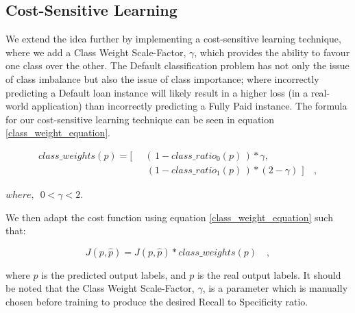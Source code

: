             \subsection{Cost-Sensitive Learning} \label{cost_sensitive_learning}
            
                We extend the idea further by implementing a cost-sensitive learning technique, where we add a Class Weight Scale-Factor, $\gamma$, which provides the ability to favour one class over the other. The Default classification problem has not only the issue of class imbalance but also the issue of class importance; where incorrectly predicting a Default loan instance will likely result in a higher loss (in a real-world application) than incorrectly predicting a Fully Paid instance. The formula for our cost-sensitive learning technique can be seen in equation \ref{class_weight_equation}.
                
                \begin{align} \label{class_weight_equation}
                    class\_weights(p) = [\,
                    & \, 
                        \, (\,1 - class\_ratio_0(p)\,) * \gamma , 
                        \nonumber \\
                    & \,
                        \, \,(1 - class\_ratio_1(p)\,) * (2 - \gamma) \, \,] \quad,
                \end{align}
                
                $where, \,\,\, 0 < \gamma < 2$.
                
                \vspace*{0.4cm}
        
                \noindent We then adapt the cost function using equation \ref{class_weight_equation} such that:
        
                \begin{equation} \label{input_sum_neuron}
                        J(p, \hat{p}) = J(p, \hat{p}) * class\_weights(p) \quad,
                \end{equation}
                
                \vspace*{0.5cm}
                
                where $\hat{p}$ is the predicted output labels, and $p$ is the real output labels. 
                It should be noted that the Class Weight Scale-Factor, $\gamma$, is a parameter which is manually chosen before training to produce the desired Recall to Specificity ratio.
            
